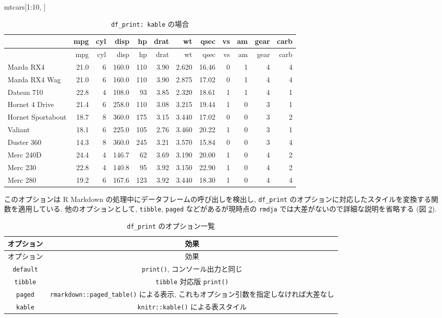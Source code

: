 \documentclass[
]{bxjsbook}
\newenvironment{Shaded}{\begin{snugshade}}{\end{snugshade}}
\newcommand{\DecValTok}[1]{\textcolor[rgb]{0.00,0.00,0.81}{#1}}
\newcommand{\NormalTok}[1]{#1}
\newcommand{\SpecialCharTok}[1]{\textcolor[rgb]{0.00,0.00,0.00}{#1}}
\theoremstyle{definition}
\theoremstyle{definition}
\theoremstyle{definition}
\theoremstyle{remark}
\begin{document}
\begin{Shaded}
\begin{Highlighting}[numbers=left,,]
\NormalTok{mtcars[}\DecValTok{1}\SpecialCharTok{:}\DecValTok{10}\NormalTok{, ]}
\end{Highlighting}
\end{Shaded}

\begin{longtable}[]{@{}lrrrrrrrrrrr@{}}
\caption{\label{tab:df-print-kable}\texttt{df\_print:\ kable}
の場合}\tabularnewline
\toprule
& mpg & cyl & disp & hp & drat & wt & qsec & vs & am & gear &
carb\tabularnewline
\midrule
\endfirsthead
\toprule
& mpg & cyl & disp & hp & drat & wt & qsec & vs & am & gear &
carb\tabularnewline
\midrule
\endhead
Mazda RX4 & 21.0 & 6 & 160.0 & 110 & 3.90 & 2.620 & 16.46 & 0 & 1 & 4 &
4\tabularnewline
Mazda RX4 Wag & 21.0 & 6 & 160.0 & 110 & 3.90 & 2.875 & 17.02 & 0 & 1 &
4 & 4\tabularnewline
Datsun 710 & 22.8 & 4 & 108.0 & 93 & 3.85 & 2.320 & 18.61 & 1 & 1 & 4 &
1\tabularnewline
Hornet 4 Drive & 21.4 & 6 & 258.0 & 110 & 3.08 & 3.215 & 19.44 & 1 & 0 &
3 & 1\tabularnewline
Hornet Sportabout & 18.7 & 8 & 360.0 & 175 & 3.15 & 3.440 & 17.02 & 0 &
0 & 3 & 2\tabularnewline
Valiant & 18.1 & 6 & 225.0 & 105 & 2.76 & 3.460 & 20.22 & 1 & 0 & 3 &
1\tabularnewline
Duster 360 & 14.3 & 8 & 360.0 & 245 & 3.21 & 3.570 & 15.84 & 0 & 0 & 3 &
4\tabularnewline
Merc 240D & 24.4 & 4 & 146.7 & 62 & 3.69 & 3.190 & 20.00 & 1 & 0 & 4 &
2\tabularnewline
Merc 230 & 22.8 & 4 & 140.8 & 95 & 3.92 & 3.150 & 22.90 & 1 & 0 & 4 &
2\tabularnewline
Merc 280 & 19.2 & 6 & 167.6 & 123 & 3.92 & 3.440 & 18.30 & 1 & 0 & 4 &
4\tabularnewline
\bottomrule
\end{longtable}

このオプションは R Markdown の処理中にデータフレームの呼び出しを検出し,
\texttt{df\_print}
のオプションに対応したスタイルを変換する関数を適用している.
他のオプションとして, \texttt{tibble}, \texttt{paged}
などがあるが現時点の \texttt{rmdja}
では大差がないので詳細な説明を省略する (図 \ref{tab:df-print-ops}).

\begin{longtable}[]{@{}cc@{}}
\caption{\label{tab:df-print-ops} \texttt{df\_print}
のオプション一覧}\tabularnewline
\toprule
オプション & 効果\tabularnewline
\midrule
\endfirsthead
\toprule
オプション & 効果\tabularnewline
\midrule
\endhead
\texttt{default} & \texttt{print()}, コンソール出力と同じ\tabularnewline
\texttt{tibble} & \texttt{tibble} 対応版 \texttt{print()}\tabularnewline
\texttt{paged} & \texttt{rmarkdown::paged\_table()} による表示,
これもオプション引数を指定しなければ大差なし\tabularnewline
\texttt{kable} & \texttt{knitr::kable()} による表スタイル\tabularnewline
\bottomrule
\end{longtable}
\end{document}
